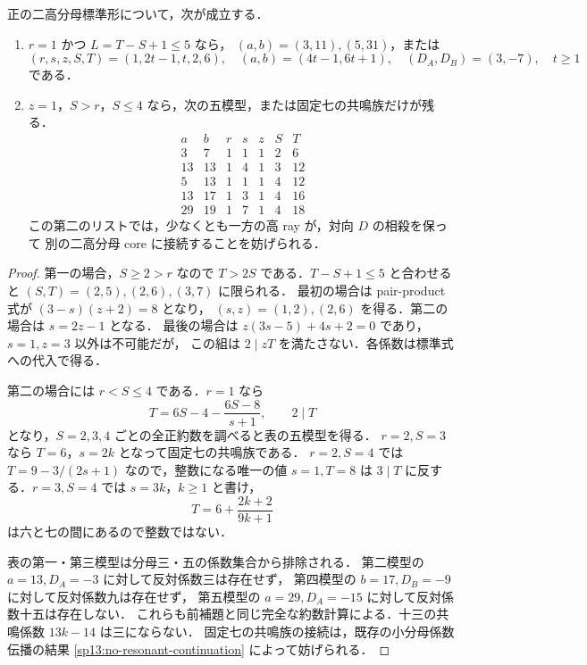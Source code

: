 \begin{lemma}
\label{cp14:small-middle}
正の二高分母標準形について，次が成立する．
\begin{enumerate}
\item $r=1$ かつ $L=T-S+1\leq5$ なら，
$(a,b)=(3,11),(5,31)$，または
\[
 (r,s,z,S,T)=(1,2t-1,t,2,6),\quad
 (a,b)=(4t-1,6t+1),\quad (D_A,D_B)=(3,-7),\quad t\geq1
\]
である．
\item $z=1$，$S>r$，$S\leq4$ なら，次の五模型，または固定七の共鳴族だけが残る．
\[
\begin{array}{rr|rrrrr}
a&b&r&s&z&S&T\\\hline
3&7&1&1&1&2&6\\
13&13&1&4&1&3&12\\
5&13&1&1&1&4&12\\
13&17&1&3&1&4&16\\
29&19&1&7&1&4&18
\end{array}
\]
この第二のリストでは，少なくとも一方の高 ray が，対向 $D$ の相殺を保って
別の二高分母 core に接続することを妨げられる．
\end{enumerate}
\end{lemma}

\begin{proof}
第一の場合，$S\geq2>r$ なので $T>2S$ である．$T-S+1\leq5$ と合わせると
$(S,T)=(2,5),(2,6),(3,7)$ に限られる．
最初の場合は pair-product 式が $(3-s)(z+2)=8$ となり，
$(s,z)=(1,2),(2,6)$ を得る．第二の場合は $s=2z-1$ となる．
最後の場合は $z(3s-5)+4s+2=0$ であり，$s=1,z=3$ 以外は不可能だが，
この組は $2\mid zT$ を満たさない．各係数は標準式への代入で得る．

第二の場合には $r<S\leq4$ である．$r=1$ なら
\[
 T=6S-4-\frac{6S-8}{s+1},\qquad 2\mid T
\]
となり，$S=2,3,4$ ごとの全正約数を調べると表の五模型を得る．
$r=2,S=3$ なら $T=6$，$s=2k$ となって固定七の共鳴族である．
$r=2,S=4$ では $T=9-3/(2s+1)$ なので，整数になる唯一の値 $s=1,T=8$ は
$3\mid T$ に反する．$r=3,S=4$ では $s=3k$，$k\geq1$ と書け，
\[
 T=6+\frac{2k+2}{9k+1}
\]
は六と七の間にあるので整数ではない．

表の第一・第三模型は分母三・五の係数集合から排除される．
第二模型の $a=13,D_A=-3$ に対して反対係数三は存在せず，
第四模型の $b=17,D_B=-9$ に対して反対係数九は存在せず，
第五模型の $a=29,D_A=-15$ に対して反対係数十五は存在しない．
これらも前補題と同じ完全な約数計算による．十三の共鳴係数 $13k-14$ は三にならない．
固定七の共鳴族の接続は，既存の小分母係数伝播の結果
\ref{sp13:no-resonant-continuation} によって妨げられる．
\end{proof}

